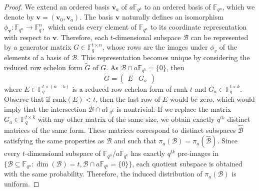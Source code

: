 \documentclass{article}
\newcommand{\Fq}{\mathbb{F}_{q}}
\newcommand{\Fqn}{\mathbb{F}_{q^n}}
\newcommand{\Fqk}{\mathbb{F}_{q^k}}
\newcommand{\rank}{\mathrm{rank}}
\newcommand{\calB}{\mathcal{B}}
\begin{document}
\begin{proof}
We extend an ordered basis $\bm v_a$ of $a\Fqk$ to an ordered basis of $\Fqn$, which we denote by $\bm v=(\bm v_0,\bm v_a).$
The basis $\bm v$ naturally defines an isomorphism $\phi_{\bm v}:\Fqn\to\Fq^n,$ which sends every element of $\Fqn$ to its coordinate representation with respect to $\bm v$. Therefore, each $t$-dimensional subspace $\mathcal{B}$ can be represented by a generator matrix $G \in \mathbb{F}_q^{t \times n}$, whose rows are the images under $\phi_v$ of the elements of a basis of $\mathcal{B}$. This representation becomes unique by considering the reduced row echelon form $\widetilde{G}$ of $G$.
As $\calB \cap a \Fqk = \{0\}$, then
$$
\widetilde{G} = 
\left (
    \begin{array}{c|c}
    E & G_a
    \end{array}
\right )
$$
where $E\in \Fq^{t \times {(n-k)}}$ is a reduced row echelon form of rank $t$ and $G_a \in \Fq^{t \times k}$. Observe that if $\rank(E) < t$, then the last row of $E$ would be zero, which would imply that the intersection $\calB \cap a \Fqk$ is nontrivial. If we replace the matrix $G_a \in \Fq^{t \times k}$ with any other matrix of the same size, we obtain exactly $q^{tk}$ distinct matrices of the same form. These matrices correspond to distinct subspaces $\hat{\calB}$ satisfying the same properties as $\calB$ and such that $\pi_a(\calB) = \pi_a(\hat{\calB})$. Since every $t$-dimensional subspace of $\Fqn/a\Fqk$ has exactly $q^{tk}$ pre-images in $\{\calB\subseteq \mathbb F_{q^n}\colon\dim(\calB)=t,\calB\cap a\Fqk=\{0\}\}$, each quotient subspace is obtained with the same probability. Therefore, the induced distribution of $\pi_a(\calB)$ is uniform.
\end{proof}
\end{document}

